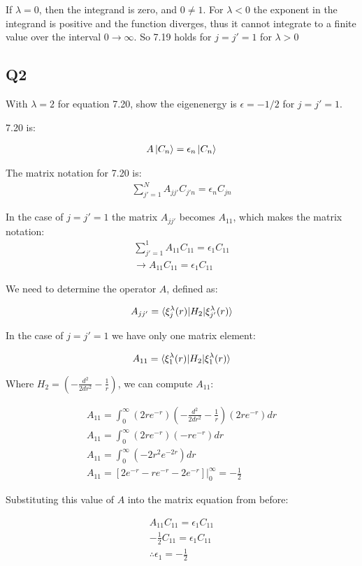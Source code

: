\documentclass{article}
\begin{document}
		If $\lambda = 0$, then the integrand is zero, and $0 \neq 1$. For $\lambda < 0$ the exponent in the integrand is positive and the function diverges,
		thus it cannot integrate to a finite value over the interval $0 \to \infty$. So 7.19 holds for $j=j'=1$ for $\lambda > 0$
		
		\subsection{Q2}
		
		With $\lambda = 2$ for equation 7.20, show the eigenenergy is $\epsilon = -1/2$ for $j=j'=1$.
		
		7.20 is:
		
		\begin{gather}
			A\ket{C_n} = \epsilon_n\ket{C_n}
		\end{gather}
		
		The matrix notation for 7.20 is:
		\begin{gather}
			\sum_{j'=1}^{N} A_{jj'}C_{j'n} = \epsilon_n C_{jn}
		\end{gather}
		
		In the case of $j=j'=1$ the matrix $A_{jj'}$ becomes $A_{11}$, which makes the matrix notation:
		\begin{gather}
			\sum_{j'=1}^{1} A_{11}C_{11} = \epsilon_1 C_{11}\\
			\to A_{11}C_{11} = \epsilon_1 C_{11}
		\end{gather}
		
		
		
		
		We need to determine the operator $A$, defined as:
		
		\begin{gather}
			A_{jj'} = \braket{\xi^{\lambda}_{j}(r)| H_2 |\xi^{\lambda}_{j'}(r)}
		\end{gather}
		
		In the case of $j=j'=1$ we have only one matrix element:
		
		\begin{gather}
			A_{11} = \braket{\xi^{\lambda}_{1}(r)| H_2 |\xi^{\lambda}_{1}(r)}
		\end{gather}
		
		Where $H_2 = (-\frac{d^2}{2dr^2}-\frac{1}{r})$, we can compute $A_{11}$:
		
		\begin{gather}
			A_{11} = \int_{0}^{\infty}(2re^{-r})(-\frac{d^2}{2dr^2}-\frac{1}{r})(2re^{-r})dr\\
			A_{11} = \int_{0}^{\infty}(2re^{-r})(-re^{-r})dr\\
			A_{11} = \int_{0}^{\infty}(-2r^2e^{-2r})dr\\
			A_{11} = [2e^{-r}-re^{-r}-2e^{-r}]|^{\infty}_{0}=-\frac{1}{2}
		\end{gather}
		
		Substituting this value of $A$ into the matrix equation from before:
		
		\begin{gather}
			A_{11}C_{11} = \epsilon_1 C_{11}\\
			-\frac{1}{2}C_{11} = \epsilon_1 C_{11}\\
			\therefore \epsilon_1 = -\frac{1}{2}
		\end{gather}
		
\end{document}
